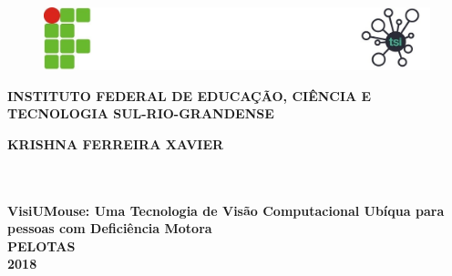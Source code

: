 \thispagestyle{empty}

\vfill
 \begin{center}


		\begin{figure}[t]
			\centering
			\includegraphics{figures/logo-ifsul-pelotas-tsi.jpg}	
		\end{figure}

 {\large\bfseries INSTITUTO FEDERAL DE EDUCAÇÃO, CIÊNCIA E TECNOLOGIA SUL-RIO-GRANDENSE} \\

    \vspace*{1in}
    \begin{large} \bfseries KRISHNA FERREIRA XAVIER\end{large}\\[0.4in]

    \vspace*{4cm}
    \noindent \\
    \large\bfseries{VisiUMouse: Uma Tecnologia de Visão Computacional Ubíqua para pessoas com Deficiência Motora} \\
    \vfill
    \large\bfseries{ PELOTAS \\ 2018}
\end{center}

\normalsize

